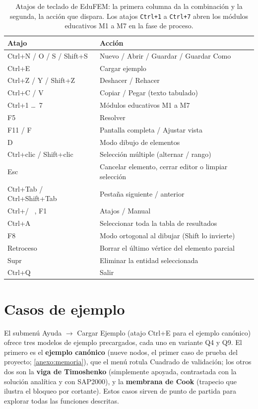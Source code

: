\begin{table}[htbp]
\centering
\caption[Atajos de teclado de EduFEM.]{Atajos de teclado de EduFEM: la primera columna da la combinación y la segunda, la acción que dispara. Los atajos \texttt{Ctrl+1} a \texttt{Ctrl+7} abren los módulos educativos M1 a M7 en la fase de proceso.}
\label{tab:atajos}
\begin{tabular}{l l}
\hline
Atajo & Acción \\
\hline
Ctrl+N / O / S / Shift+S & Nuevo / Abrir / Guardar / Guardar Como \\
Ctrl+E                   & Cargar ejemplo \\
Ctrl+Z / Y / Shift+Z     & Deshacer / Rehacer \\
Ctrl+C / V               & Copiar / Pegar (texto tabulado) \\
Ctrl+1 \dots\ 7          & Módulos educativos M1 a M7 \\
F5                       & Resolver \\
F11 / F                  & Pantalla completa / Ajustar vista \\
D                        & Modo dibujo de elementos \\
Ctrl+clic / Shift+clic   & Selección múltiple (alternar / rango) \\
Esc                      & Cancelar elemento, cerrar editor o limpiar selección \\
Ctrl+Tab / Ctrl+Shift+Tab & Pestaña siguiente / anterior \\
Ctrl+/ \ , F1            & Atajos / Manual \\
Ctrl+A                   & Seleccionar toda la tabla de resultados \\
F8                       & Modo ortogonal al dibujar (Shift lo invierte) \\
Retroceso                & Borrar el último vértice del elemento parcial \\
Supr                     & Eliminar la entidad seleccionada \\
Ctrl+Q                   & Salir \\
\hline
\end{tabular}
\end{table}

\section{Casos de ejemplo}

El submenú \textsf{Ayuda} $\rightarrow$ \textsf{Cargar Ejemplo} (atajo Ctrl+E para el ejemplo canónico) ofrece tres modelos de ejemplo precargados, cada uno en variante Q4 y Q9. El primero es el \textbf{ejemplo canónico} (nueve nodos, el primer caso de prueba del proyecto; \autoref{anexo:memoria}), que el menú rotula \textsf{Cuadrado de validación}; los otros dos son la \textbf{viga de Timoshenko} (simplemente apoyada, contrastada con la solución analítica y con SAP2000), y la \textbf{membrana de Cook} (trapecio que ilustra el bloqueo por cortante). Estos casos sirven de punto de partida para explorar todas las funciones descritas.



